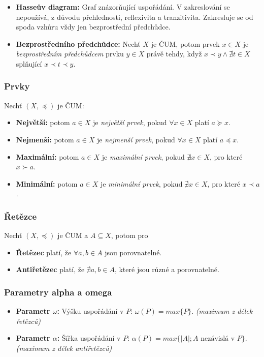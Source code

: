 \documentclass[10pt,a4paper]{article}
\begin{document}
\begin{itemize}
    \item \textbf{Hasseův diagram:} Graf znázorňující uspořádání. V zakreslování se nepoužívá, z důvodu přehlednosti, reflexivita a tranzitivita. Zakresluje se od spoda vzhůru vždy jen bezprostřední předchůdce.
    
    \item \textbf{Bezprostředního předchůdce:} Nechť $X$ je ČUM, potom prvek $x\in X$ je \textit{bezprostředním předchůdcem} prvku $y\in X$ právě tehdy, když $x \prec y \land \nexists t\in X$ splňující $x \prec t \prec y$.
\end{itemize}

\subsubsection{Prvky}

Nechť $(X, \preceq)$ je ČUM:
\begin{itemize}
    \item \textbf{Největší:} potom $a\in X$ je \textit{největší prvek}, pokud $\forall x \in X$ platí $a \succeq x$.
    \item \textbf{Nejmenší:} potom $a\in X$ je \textit{nejmenší prvek}, pokud $\forall x \in X$ platí $a \preceq x$.
    \item \textbf{Maximální:} potom $a\in X$ je \textit{maximální prvek}, pokud $\nexists x \in X$, pro které $x \succ a$.
    \item \textbf{Minimální:} potom $a\in X$ je \textit{minimální prvek}, pokud $\nexists x \in X$, pro které $x \prec a$.
\end{itemize}

\subsubsection{Řetězce}

Nechť $(X, \preceq)$ je ČUM a $A \subseteq X$, potom pro

\begin{itemize}
    \item \textbf{Řetězec} platí, že $\forall a, b \in A$ jsou porovnatelné.
    \item \textbf{Antiřetězec} platí, že $\nexists a, b \in A$, které jsou různé a porovnatelné.
\end{itemize}

\subsubsection{Parametry alpha a omega}
\begin{itemize}
    \item \textbf{Parametr $\omega$:} Výšku uspořádání v $P$: $\omega(P) = max\{P\}$. \textit{(maximum z délek řetězců)}
    \item \textbf{Parametr $\alpha$:} Šířka uspořádání v $P$: $\alpha(P) = max\{|A|; A \text{ nezávislá v }P\}$. \textit{(maximum z délek antiřetězců)}
\end{itemize}
\end{document}
